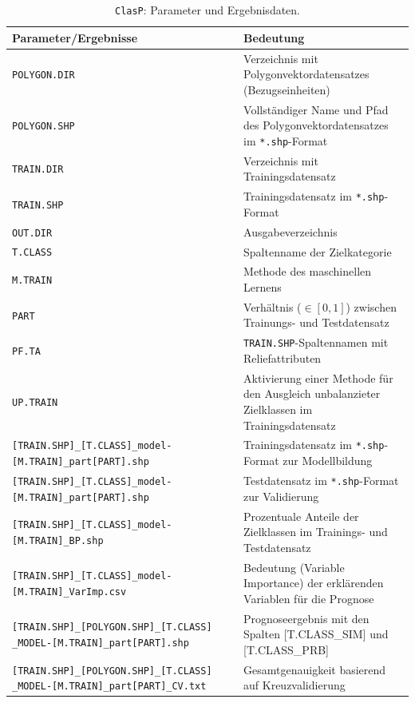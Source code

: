 \begin{table}[p]
	\caption{\texttt{ClasP}: Parameter und Ergebnisdaten.}
	\centering
	\begin{tabularx}{\textwidth}{X|X}
		\toprule
		\textbf{Parameter/Ergebnisse} & \textbf{Bedeutung} \\
		\midrule
		\texttt{POLYGON.DIR} & Verzeichnis mit Polygonvektordatensatzes (Bezugseinheiten) \\ \midrule
		\texttt{POLYGON.SHP} & Vollständiger Name und Pfad des Polygonvektordatensatzes im \texttt{*.shp}-Format\\ \midrule
		\texttt{TRAIN.DIR} & Verzeichnis mit Trainingsdatensatz\\\midrule
		\texttt{TRAIN.SHP} & Trainingsdatensatz  im \texttt{*.shp}-Format\\\midrule
		\texttt{OUT.DIR} & Ausgabeverzeichnis \\\midrule
		\texttt{T.CLASS} & Spaltenname der Zielkategorie\\\midrule
		\texttt{M.TRAIN} & Methode des maschinellen Lernens\\\midrule
		\texttt{PART} & Verhältnis ($\in[0,1]$) zwischen Trainungs- und Testdatensatz\\\midrule
		\texttt{PF.TA} & \texttt{TRAIN.SHP}-Spaltennamen mit Reliefattributen\\\midrule
		\texttt{UP.TRAIN} & Aktivierung einer Methode für den Ausgleich unbalanzieter Zielklassen im Trainingsdatensatz\\\midrule\midrule
		\texttt{[TRAIN.SHP]\_[T.CLASS]\_model- [M.TRAIN]\_part[PART].shp} & Trainingsdatensatz im \texttt{*.shp}-Format zur Modellbildung\\\midrule
		\texttt{[TRAIN.SHP]\_[T.CLASS]\_model- [M.TRAIN]\_part[PART].shp} & Testdatensatz im \texttt{*.shp}-Format zur Validierung\\\midrule
		\texttt{[TRAIN.SHP]\_[T.CLASS]\_model- [M.TRAIN]\_BP.shp} & Prozentuale Anteile der Zielklassen im Trainings- und Testdatensatz\\\midrule
		\texttt{[TRAIN.SHP]\_[T.CLASS]\_model- [M.TRAIN]\_VarImp.csv} & Bedeutung (Variable Importance) der erklärenden Variablen für die Prognose\\\midrule
		\texttt{[TRAIN.SHP]\_[POLYGON.SHP]\_[T.CLASS] \_MODEL-[M.TRAIN]\_part[PART].shp} & Prognoseergebnis mit den Spalten [T.CLASS\_SIM] und [T.CLASS\_PRB]\\\midrule
		\texttt{[TRAIN.SHP]\_[POLYGON.SHP]\_[T.CLASS] \_MODEL-[M.TRAIN]\_part[PART]\_CV.txt} & Gesamtgenauigkeit basierend auf Kreuzvalidierung\\\midrule

\end{tabularx}
\end{table}
